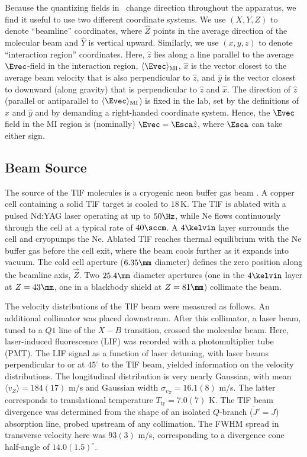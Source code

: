 Because the quantizing fields in \CENTREX~change direction throughout the apparatus, we find it useful to use two different coordinate systems.  We use $(X,Y,Z)$ to denote ``beamline'' coordinates, where $\hat{Z}$ points in the average direction of the molecular beam and $\hat{Y}$ is vertical upward. Similarly, we use $(x,y,z)$ to denote ``interaction region'' coordinates. Here, $\hat{z}$ lies along a line parallel to the average $\Evec$-field in the interaction region, $\langle\Evec\rangle_{\rm MI}$, $\hat{x}$ is the vector closest to the average beam velocity that is also perpendicular to $\hat{z}$, and $\hat{y}$ is the vector closest to downward (along gravity) that is perpendicular to $\hat{z}$ and $\hat{x}$.  
The direction of $\hat{z}$ (parallel or antiparallel to $\langle\Evec\rangle_{\rm MI}$) is fixed in the lab, set by the definitions of $\hat{x}$ and $\hat{y}$ and by demanding a right-handed coordinate system.  Hence, the $\Evec$ field in the MI region is (nominally) $\Evec = \Esca \hat{z}$, where $\Esca$ can take either sign.

\subsection{Beam Source}
\label{sec:beamsource}
The source of the TlF molecules is a cryogenic neon buffer gas beam \cite{hutzler2012buffer}. A copper cell containing a solid TlF target is cooled to $18\,$K. The TlF is ablated with a pulsed Nd:YAG laser operating at up to $50\Hz$, while Ne flows continuously through the cell at a typical rate of $40\sccm$. A $4\kelvin$ layer surrounds the cell and cryopumps the Ne.  Ablated TlF reaches thermal equilibrium with the Ne buffer gas before the cell exit, where the beam cools further as it expands into vacuum. The cold cell aperture ($6.35\mm$ diameter) defines the zero position along the beamline axis, $\vec{Z}$. Two $25.4\mm$ diameter apertures (one in the $4\kelvin$ layer at $Z=43\mm$, one in a blackbody shield at $Z=81\mm$) collimate the beam. 

The velocity distributions of the TlF beam were measured as follows. An additional collimator 
was placed downstream. After this collimator, a laser beam, tuned to a $Q1$ line of the $X-B$ transition, crossed the molecular beam. Here, laser-induced fluorescence (LIF) was recorded with a photomultiplier tube (PMT). The LIF signal as a function of laser detuning, with laser beams perpendicular to or at $45^\circ$ to the TlF beam, yielded information on the velocity distributions. The longitudinal distribution is very nearly Gaussian, with mean $\langle v_Z \rangle = 184(17)$ m/s and Gaussian width $\sigma_{v_Z} = 16.1(8)$ m/s. The latter corresponds to translational temperature $T_\text{tr}=7.0(7)$ K.
The TlF beam divergence was determined from the shape of an isolated $Q$-branch ($\widetilde{J}'= J$) absorption line,  probed upstream of any collimation. The FWHM spread in transverse velocity here was $93(3)$ m/s, corresponding to a divergence cone half-angle of $14.0(1.5)^\circ$.

